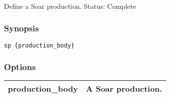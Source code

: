 \subsection{}
\label{sp}
Define a Soar production. 
 Status: Complete
\subsubsection*{Synopsis}
\begin{verbatim}
sp {production_body}
\end{verbatim}
\subsubsection*{Options}
\begin{tabular}{|l|l|}
\hline 
 production\_body  & A Soar production.  \\
 \hline 
\end{tabular}
